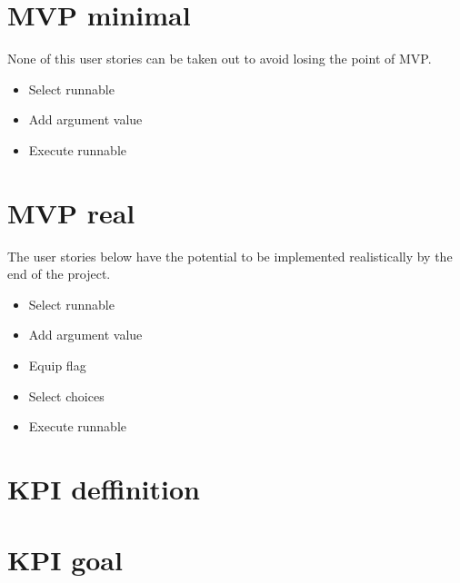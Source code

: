 \documentclass{article}
\begin{document}
\section{MVP minimal}
None of this user stories can be taken out to avoid losing the point of MVP.
\begin{itemize}
    \item Select runnable
    \item Add argument value 
    \item Execute runnable
\end{itemize}

\section{MVP real}
The user stories below have the potential to be implemented realistically by the end of the project.
\begin{itemize}
    \item Select runnable
    \item Add argument value
    \item Equip flag
    \item Select choices
    \item Execute runnable
\end{itemize}

\section{KPI deffinition}

\section{KPI goal}
\end{document}
